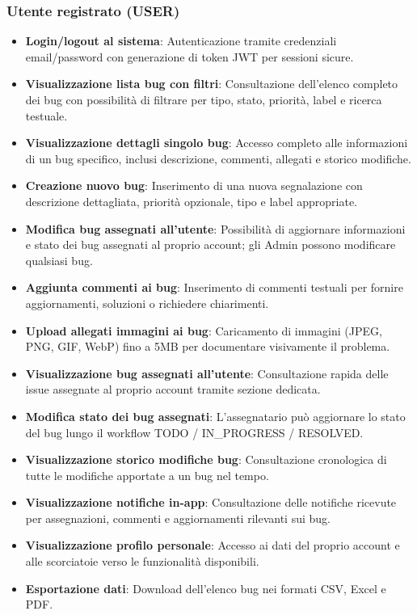 ﻿\documentclass[a4paper,11pt]{article}
\begin{document}
\subsubsection{Utente registrato (USER)}
\begin{itemize}
  \item \textbf{Login/logout al sistema}: Autenticazione tramite credenziali email/password con generazione di token JWT per sessioni sicure.
  \item \textbf{Visualizzazione lista bug con filtri}: Consultazione dell'elenco completo dei bug con possibilit\`a di filtrare per tipo, stato, priorit\`a, label e ricerca testuale.
  \item \textbf{Visualizzazione dettagli singolo bug}: Accesso completo alle informazioni di un bug specifico, inclusi descrizione, commenti, allegati e storico modifiche.
  \item \textbf{Creazione nuovo bug}: Inserimento di una nuova segnalazione con descrizione dettagliata, priorit\`a opzionale, tipo e label appropriate.
  \item \textbf{Modifica bug assegnati all'utente}: Possibilit\`a di aggiornare informazioni e stato dei bug assegnati al proprio account; gli Admin possono modificare qualsiasi bug.
  \item \textbf{Aggiunta commenti ai bug}: Inserimento di commenti testuali per fornire aggiornamenti, soluzioni o richiedere chiarimenti.
  \item \textbf{Upload allegati immagini ai bug}: Caricamento di immagini (JPEG, PNG, GIF, WebP) fino a 5MB per documentare visivamente il problema.
  \item \textbf{Visualizzazione bug assegnati all'utente}: Consultazione rapida delle issue assegnate al proprio account tramite sezione dedicata.
  \item \textbf{Modifica stato dei bug assegnati}: L'assegnatario pu\`o aggiornare lo stato del bug lungo il workflow TODO / IN\_PROGRESS / RESOLVED.
  \item \textbf{Visualizzazione storico modifiche bug}: Consultazione cronologica di tutte le modifiche apportate a un bug nel tempo.
  \item \textbf{Visualizzazione notifiche in-app}: Consultazione delle notifiche ricevute per assegnazioni, commenti e aggiornamenti rilevanti sui bug.
  \item \textbf{Visualizzazione profilo personale}: Accesso ai dati del proprio account e alle scorciatoie verso le funzionalit\`a disponibili.
  \item \textbf{Esportazione dati}: Download dell'elenco bug nei formati CSV, Excel e PDF.
\end{itemize}
\end{document}
